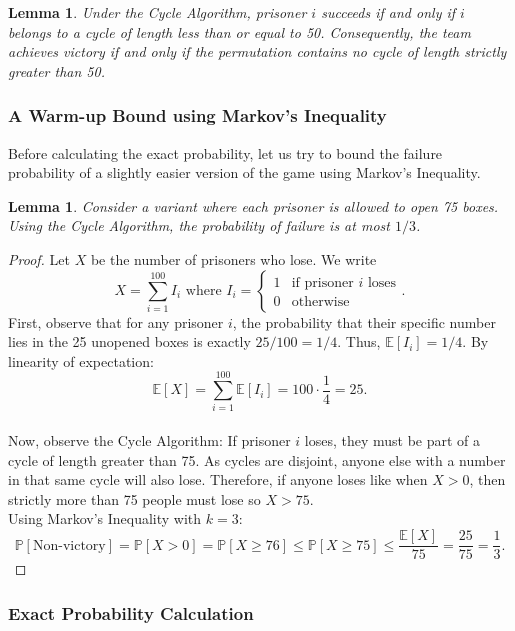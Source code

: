 \documentclass[a4paper]{article}
\newtheorem{lem}[thm]{Lemma}
\begin{document}
\begin{lem}
    Under the Cycle Algorithm, prisoner $i$ succeeds if and only if $i$ belongs to a cycle of length less than or equal to 50. Consequently, the team achieves victory if and only if the permutation contains no cycle of length strictly greater than 50.
\end{lem}
\subsubsection{A Warm-up Bound using Markov's Inequality}
Before calculating the exact probability, let us try to bound the failure probability of a slightly easier version of the game using Markov's Inequality.

\begin{lem}
    Consider a variant where each prisoner is allowed to open 75 boxes. Using the Cycle Algorithm, the probability of failure is at most $1/3$.
\end{lem}
\begin{proof}
    Let $X$ be the number of prisoners who lose. We write \[
    X = \sum_{i=1}^{100} I_i \text{ where } I_i=\begin{cases}
        1 & \text{if prisoner $i$ loses} \\
        0 & \text{otherwise} 
    \end{cases}
    .\]
    First, observe that for any prisoner $i$, the probability that their specific number lies in the 25 unopened boxes is exactly $25/100 = 1/4$. Thus, $\mathbb{E}[I_i] = 1/4$. By linearity of expectation:
    \[
    \mathbb{E}[X] = \sum_{i=1}^{100} \mathbb{E}[I_i] = 100 \cdot \frac{1}{4} = 25.
    \]\\
    Now, observe the Cycle Algorithm: If prisoner $i$ loses, they must be part of a cycle of length greater than 75. As cycles are disjoint, anyone else with a number in that same cycle will also lose. Therefore, if anyone loses like when $X>0$, then strictly more than 75 people must lose so $X>75$.\\
    Using Markov's Inequality with $k=3$:
    \[
    \mathbb{P}[\text{Non-victory}] = \mathbb{P}[X > 0] = \mathbb{P}[X \geq 76] \leq \mathbb{P}[X \geq 75] \leq \frac{\mathbb{E}[X]}{75} = \frac{25}{75} = \frac{1}{3}.
    \]
\end{proof}
\subsubsection{Exact Probability Calculation}
\end{document}
